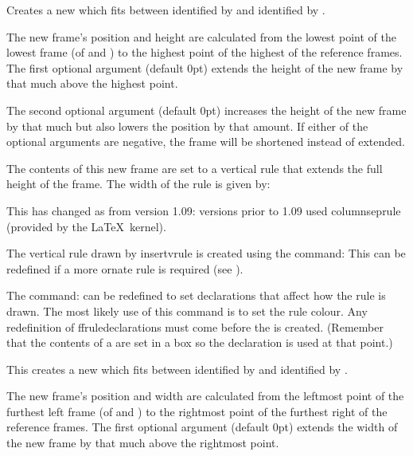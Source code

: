 \documentclass[fontsize=12pt]{scrbook}
\begin{document}
Creates a new  which fits between  
 identified by  and   
identified by .

The new frame's  position and height are calculated from the
lowest point of the lowest frame (of  and ) to the 
highest point of the highest of the reference frames. 
The first optional argument  (default 0pt)
extends the height of the new frame by that much above the highest point.

The second optional argument  (default 0pt) increases
the height of the new frame by that much but also lowers the
 position by that amount.  If either of the optional
arguments are negative, the frame will be shortened instead of
extended.

The contents of this new frame are set to a vertical rule that
extends the full height of the frame.
The width of the rule is given by:

\begin{warning}
This has changed as from version 1.09: versions
prior to 1.09 used \gls{columnseprule} (provided by the \LaTeX\
kernel).
\end{warning}

The vertical rule drawn by \gls{insertvrule} is created using 
the command:
This can be redefined if a more ornate rule is required
(see ).

The command:
can be redefined to set declarations that affect how the rule is drawn. 
The most likely use of this command is to set the rule colour. 
Any redefinition of \gls{ffruledeclarations} must come before the
 is created. (Remember that the contents of a
\idx{static-frame} are set in a box so the declaration is used at
that point.)

This creates a new  which fits between  
 identified by \meta{ID1} and \meta{type-2} \idx*{frame} 
identified by \meta{ID2}.

The new frame's  position and width are calculated from the
leftmost point of the furthest left frame (of \meta{ID1} and \meta{ID2}) to the 
rightmost point of the furthest right of the reference frames. 
The first optional argument  (default 0pt)
extends the width of the new frame by that much above the rightmost point.
\end{document}
